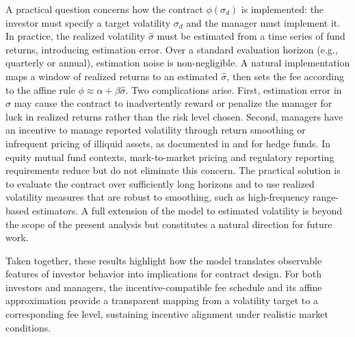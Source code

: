 A practical question concerns how the contract $\phi(\sigma_d)$ is implemented: the investor must specify a target volatility $\sigma_d$ and the manager must implement it. In practice, the realized volatility $\hat{\sigma}$ must be estimated from a time series of fund returns, introducing estimation error. Over a standard evaluation horizon (e.g., quarterly or annual), estimation noise is non-negligible. A natural implementation maps a window of realized returns to an estimated $\hat{\sigma}$, then sets the fee according to the affine rule $\phi \approx \alpha + \beta\hat{\sigma}$. Two complications arise. First, estimation error in $\hat{\sigma}$ may cause the contract to inadvertently reward or penalize the manager for luck in realized returns rather than the risk level chosen. Second, managers have an incentive to manage reported volatility through return smoothing or infrequent pricing of illiquid assets, as documented in \citet{GetmanskyLoMakarov2004} and \citet{BollenPool2009} for hedge funds. In equity mutual fund contexts, mark-to-market pricing and regulatory reporting requirements reduce but do not eliminate this concern. The practical solution is to evaluate the contract over sufficiently long horizons and to use realized volatility measures that are robust to smoothing, such as high-frequency range-based estimators. A full extension of the model to estimated volatility is beyond the scope of the present analysis but constitutes a natural direction for future work.

Taken together, these results highlight how the model translates observable features of investor behavior into implications for contract design. For both investors and managers, the incentive-compatible fee schedule and its affine approximation provide a transparent mapping from a volatility target to a corresponding fee level, sustaining incentive alignment under realistic market conditions.
